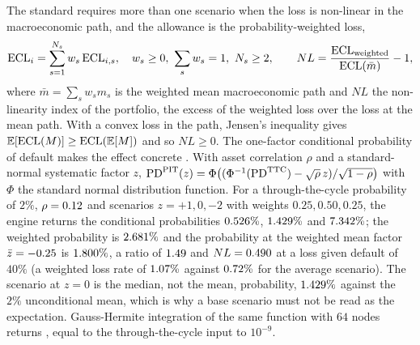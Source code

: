 The standard requires more than one scenario when the loss is non-linear in the macroeconomic path, and the allowance is the probability-weighted loss,
\begin{equation}
\mathrm{ECL}_i=\sum_{s=1}^{N_s}w_s\,\mathrm{ECL}_{i,s},\quad w_s\ge0,\ \sum_s w_s=1,\ N_s\ge2,\qquad
NL=\frac{\mathrm{ECL}_{\mathrm{weighted}}}{\mathrm{ECL}(\bar m)}-1,
\label{eq:prov-weighted}
\end{equation}
where $\bar m=\sum_s w_s m_s$ is the weighted mean macroeconomic path and $NL$ the non-linearity index of the portfolio, the excess of the weighted loss over the loss at the mean path. With a convex loss in the path, Jensen's
inequality gives $\mathbb{E}[\mathrm{ECL}(M)]\ge\mathrm{ECL}(\mathbb{E}[M])$ and so $NL\ge0$. The one-factor conditional probability of default makes the effect concrete \citep{ratings:gordy2003,ratings:bcbs2005}. With asset correlation $\rho$ and a standard-normal systematic factor $z$,
$\mathrm{PD}^{\mathrm{PIT}}(z)=\Phi\bigl((\Phi^{-1}(\mathrm{PD}^{\mathrm{TTC}})-\sqrt{\rho}\,z)/\sqrt{1-\rho}\bigr)$ with $\Phi$ the standard normal distribution function. For a through-the-cycle probability of $2\%$, $\rho=0.12$ and
scenarios $z=+1,0,-2$ with weights $0.25,0.50,0.25$, the engine returns the conditional probabilities $0.526\%$, $1.429\%$ and $7.342\%$; the weighted probability is $2.681\%$ and the probability at the weighted mean factor
$\bar z=-0.25$ is $1.800\%$, a ratio of $1.49$ and $NL=0.490$ at a loss given default of $40\%$ (a weighted loss rate of $1.07\%$ against $0.72\%$ for the average scenario). The scenario at $z=0$ is the median, not the mean, probability,
$1.429\%$ against the $2\%$ unconditional mean, which is why a base scenario must not be read as the expectation. Gauss-Hermite integration of the same function with $64$ nodes returns \pvWxGh{}, equal to the through-the-cycle input to $10^{-9}$.

